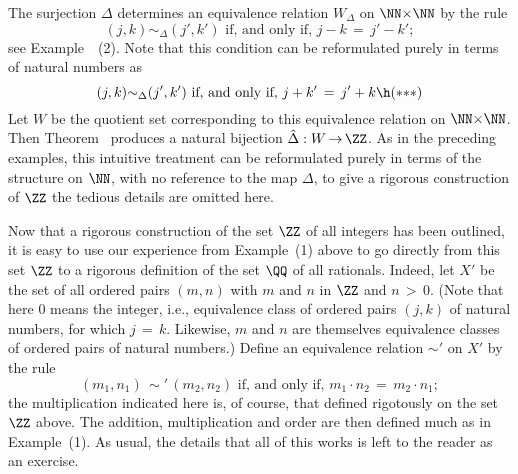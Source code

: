 {{        The surjection ${\Delta}$ determines an equivalence relation $W_{{\Delta}}$ on ${\NN}{\times}{\NN}$ by the rule
        \begin{displaymath}
        (j,k) {\sim}_{{\Delta}} (j',k') \mbox{ if, and only if, } j-k \,=\, j'-k';
        \end{displaymath}
 see Example~~(2).
    Note that this condition can be reformulated purely in terms of natural numbers as
        \begin{displaymath}
        (j,k) {\sim}_{{\Delta}} (j',k') \mbox{ if, and only if, } j + k' \,=\, j' + k \h ({\ast}{\ast}{\ast})
        \end{displaymath}
    Let $W$ be the quotient set corresponding to this equivalence relation on ${\NN}{\times}{\NN}$.
    Then Theorem~ produces a natural bijection $\hat{{\Delta}}:W \,{\rightarrow}\, {\ZZ}$.
    As in the preceding examples, this intuitive treatment can be reformulated purely in terms of the structure on ${\NN}$,
    with no reference to the map ${\Delta}$, to give a rigorous construction of ${\ZZ}$
    the tedious details are omitted here.

        Now that a rigorous construction of the set ${\ZZ}$ of all integers has been outlined,
    it is easy to use our experience from Example~(1) above to go directly from this set ${\ZZ}$ to a rigorous definition of the set ${\QQ}$ of all rationals.
    Indeed, let $X'$ be the set of all ordered pairs $(m,n)$ with $m$ and $n$ in ${\ZZ}$ and $n\,>\,0$.
    (Note that here $0$ means the integer, i.e., equivalence class of ordered pairs $(j,k)$ of natural numbers, for which $j \,=\, k$.
    Likewise, $m$ and $n$ are themselves equivalence classes of ordered pairs of natural numbers.)
    Define an equivalence relation ${\sim}'$ on $X'$ by the rule
        \begin{displaymath}
        (m_{1}, n_{1}) \,{\sim}'\, (m_{2},n_{2}) \mbox{ if, and only if, }
        m_{1}{\cdot}n_{2} \,=\, m_{2}{\cdot}n_{1};
        \end{displaymath}
     the multiplication indicated here is, of course, that defined rigotously on the set ${\ZZ}$ above.
    The addition, multiplication and order are then defined much as in Example~(1).
    As usual, the details that all of this works is left to the reader as an exercise.

\VV

}}
